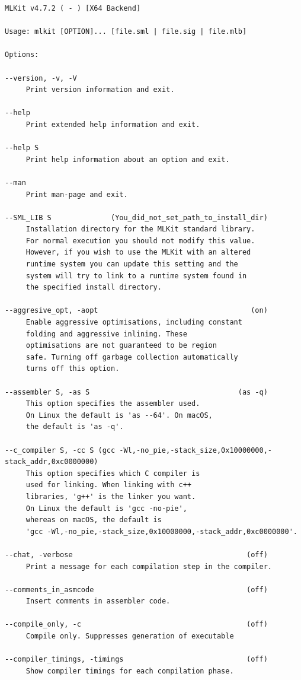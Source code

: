\documentclass[12pt]{book}
\begin{document}
\begin{verbatim}
MLKit v4.7.2 ( - ) [X64 Backend]

Usage: mlkit [OPTION]... [file.sml | file.sig | file.mlb]

Options:

--version, -v, -V
     Print version information and exit.

--help
     Print extended help information and exit.

--help S
     Print help information about an option and exit.

--man
     Print man-page and exit.

--SML_LIB S              (You_did_not_set_path_to_install_dir)
     Installation directory for the MLKit standard library.
     For normal execution you should not modify this value.
     However, if you wish to use the MLKit with an altered
     runtime system you can update this setting and the
     system will try to link to a runtime system found in
     the specified install directory.

--aggresive_opt, -aopt                                    (on)
     Enable aggressive optimisations, including constant
     folding and aggressive inlining. These
     optimisations are not guaranteed to be region
     safe. Turning off garbage collection automatically
     turns off this option.

--assembler S, -as S                                   (as -q)
     This option specifies the assembler used.
     On Linux the default is 'as --64'. On macOS,
     the default is 'as -q'.

--c_compiler S, -cc S (gcc -Wl,-no_pie,-stack_size,0x10000000,-stack_addr,0xc0000000)
     This option specifies which C compiler is
     used for linking. When linking with c++
     libraries, 'g++' is the linker you want.
     On Linux the default is 'gcc -no-pie',
     whereas on macOS, the default is
     'gcc -Wl,-no_pie,-stack_size,0x10000000,-stack_addr,0xc0000000'.

--chat, -verbose                                         (off)
     Print a message for each compilation step in the compiler.

--comments_in_asmcode                                    (off)
     Insert comments in assembler code.

--compile_only, -c                                       (off)
     Compile only. Suppresses generation of executable

--compiler_timings, -timings                             (off)
     Show compiler timings for each compilation phase.


\end{verbatim}
\end{document}
